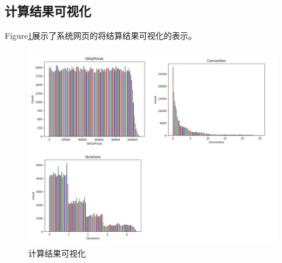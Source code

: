 \subsection{计算结果可视化}
Figure\ref{fig:sys.param}展示了系统网页的将结算结果可视化的表示。
\begin{figure}[H]
\begin{center}
\includegraphics[width=16cm]{img//result.PNG}
\caption{计算结果可视化}
\label{fig:sys.param}
\end{center}
\end{figure}